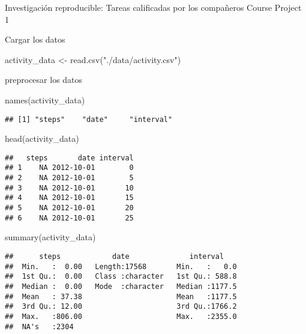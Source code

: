 \documentclass[
]{article}
\author{}
\date{\vspace{-2.5em}}
\newenvironment{Shaded}{\begin{snugshade}}{\end{snugshade}}
\newcommand{\FunctionTok}[1]{\textcolor[rgb]{0.00,0.00,0.00}{#1}}
\newcommand{\NormalTok}[1]{#1}
\newcommand{\OtherTok}[1]{\textcolor[rgb]{0.56,0.35,0.01}{#1}}
\newcommand{\StringTok}[1]{\textcolor[rgb]{0.31,0.60,0.02}{#1}}
\begin{document}
Investigación reproducible: Tareas calificadas por los compañeros Course
Project 1

Cargar los datos

\begin{Shaded}
\begin{Highlighting}[]
\NormalTok{activity\_data }\OtherTok{\textless{}{-}} \FunctionTok{read.csv}\NormalTok{(}\StringTok{"./data/activity.csv"}\NormalTok{)}
\end{Highlighting}
\end{Shaded}

preprocesar los datos

\begin{Shaded}
\begin{Highlighting}[]
\FunctionTok{names}\NormalTok{(activity\_data)}
\end{Highlighting}
\end{Shaded}

\begin{verbatim}
## [1] "steps"    "date"     "interval"
\end{verbatim}

\begin{Shaded}
\begin{Highlighting}[]
\FunctionTok{head}\NormalTok{(activity\_data)}
\end{Highlighting}
\end{Shaded}

\begin{verbatim}
##   steps       date interval
## 1    NA 2012-10-01        0
## 2    NA 2012-10-01        5
## 3    NA 2012-10-01       10
## 4    NA 2012-10-01       15
## 5    NA 2012-10-01       20
## 6    NA 2012-10-01       25
\end{verbatim}

\begin{Shaded}
\begin{Highlighting}[]
\FunctionTok{summary}\NormalTok{(activity\_data)}
\end{Highlighting}
\end{Shaded}

\begin{verbatim}
##      steps            date              interval     
##  Min.   :  0.00   Length:17568       Min.   :   0.0  
##  1st Qu.:  0.00   Class :character   1st Qu.: 588.8  
##  Median :  0.00   Mode  :character   Median :1177.5  
##  Mean   : 37.38                      Mean   :1177.5  
##  3rd Qu.: 12.00                      3rd Qu.:1766.2  
##  Max.   :806.00                      Max.   :2355.0  
##  NA's   :2304
\end{verbatim}
\end{document}
